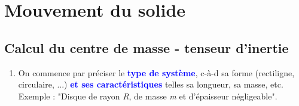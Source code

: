 \documentclass[a4paper]{article}
\begin{document}
\newpage





\section{Mouvement du solide}





\subsection{Calcul du centre de masse - tenseur d'inertie}





\begin{enumerate}





\item On commence par préciser le \textcolor{blue}{\textbf{type de système}}, c-à-d sa forme (rectiligne, circulaire, ...) \textcolor{blue}{\textbf{et ses caractéristiques}} telles sa longueur, sa masse, etc. \\
Exemple : "Disque de rayon \emph{R}, de masse \emph{m} et d'épaisseur négligeable".






\end{enumerate}
\end{document}
